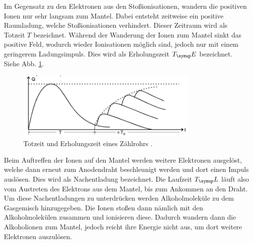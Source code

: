 Im Gegensatz zu den Elektronen aus den Stoßionisationen, wandern die positiven Ionen
nur sehr langsam zum Mantel. Dabei entsteht zeitweise ein positive Raumladung, welche
Stoßionisationen verhindert. Dieser Zeitraum wird als Totzeit $T$ bezeichnet. Während
der Wanderung der Ionen zum Mantel sinkt das positive Feld, wodurch wieder Ionisationen
möglich sind, jedoch nur mit einem geringerem Ladungsimpuls. Dies wird als Erholungszeit
$T_\su{E}$ bezeichnet. Siehe Abb. \ref{fig:totzeit}.
\begin{figure}
  \centering
  \includegraphics[width=0.8\textwidth]{bilder/totzeit.png}
  \caption{Totzeit und Erholungszeit eines Zählrohrs \cite{703}.}
  \label{fig:totzeit}
\end{figure}
Beim Auftreffen der Ionen auf den Mantel werden weitere Elektronen ausgelöst, welche
dann erneut zum Anodendraht beschleunigt werden und dort einen Impuls auslösen. Dies
wird als Nachentladung bezeichnet. Die Laufzeit $T_\su{L}$ läuft also vom Austreten
des Elektrons aus dem Mantel, bis zum Ankommen an den Draht. Um diese Nachentladungen zu
unterdrücken werden Alkoholmoleküle zu dem Gasgemisch hinzugegeben. Die Ionen stoßen
dann nämlich mit den Alkoholmolekülen zusammen und ionisieren diese. Dadurch
wandern dann die Alkoholionen zum Mantel, jedoch reicht ihre Energie nicht aus, um dort
weitere Elektronen auszulösen.

